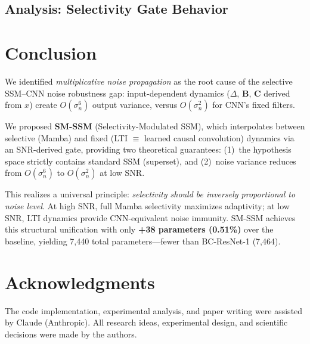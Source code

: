 \documentclass{Interspeech}
\begin{document}

\subsection{Analysis: Selectivity Gate Behavior}


\section{Conclusion}

We identified \emph{multiplicative noise propagation} as the root cause of the selective SSM--CNN noise robustness gap: input-dependent dynamics ($\Delta$, $\mathbf{B}$, $\mathbf{C}$ derived from $x$) create $O(\sigma_n^6)$ output variance, versus $O(\sigma_n^2)$ for CNN's fixed filters.

We proposed \textbf{SM-SSM} (Selectivity-Modulated SSM), which interpolates between selective (Mamba) and fixed (LTI $\equiv$ learned causal convolution) dynamics via an SNR-derived gate, providing two theoretical guarantees: (1)~the hypothesis space strictly contains standard SSM (superset), and (2)~noise variance reduces from $O(\sigma_n^6)$ to $O(\sigma_n^2)$ at low SNR.

This realizes a universal principle: \emph{selectivity should be inversely proportional to noise level}.
At high SNR, full Mamba selectivity maximizes adaptivity; at low SNR, LTI dynamics provide CNN-equivalent noise immunity.
SM-SSM achieves this structural unification with only \textbf{+38 parameters (0.51\%)} over the baseline, yielding 7,440 total parameters---fewer than BC-ResNet-1 (7,464).


\section*{Acknowledgments}
The code implementation, experimental analysis, and paper writing were assisted by Claude (Anthropic).
All research ideas, experimental design, and scientific decisions were made by the authors.



\end{document}
